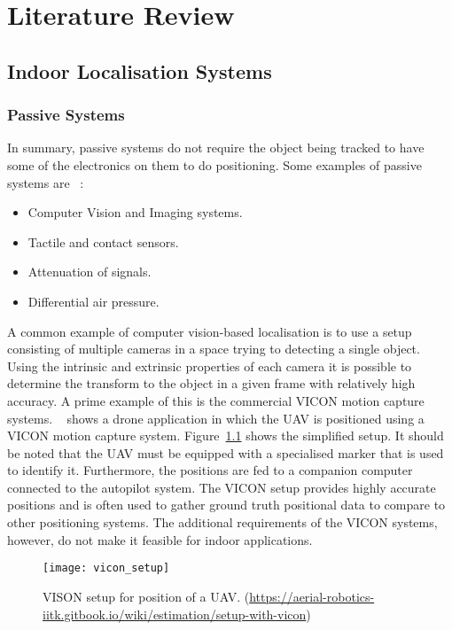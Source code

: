 \chapter{Literature Review}\label{ch:literature-review}
\section{Indoor Localisation Systems}\label{sec:indoor-localisation-sensors}
\subsection{Passive Systems}\label{subsec:passive-systems}
In summary, passive systems do not require the object being tracked to have some of the electronics on them to do positioning.
Some examples of passive systems are ~\citep{deak2012survey}:
\begin{itemize}
    \item Computer Vision and Imaging systems.
    \item Tactile and contact sensors.
    \item Attenuation of signals.
    \item Differential air pressure.
\end{itemize}
A common example of computer vision-based localisation is to use a setup consisting of multiple cameras in a space trying to detecting a single object.
Using the intrinsic and extrinsic properties of each camera it is possible to determine the transform to the object in a given frame with relatively high accuracy.
A prime example of this is the commercial VICON motion capture systems.
~\cite{aerialrobotsiitk} shows a drone application in which the UAV is positioned using a VICON motion capture system.
Figure~\ref{fig:vs} shows the simplified setup.
It should be noted that the UAV must be equipped with a specialised marker that is used to identify it.
Furthermore, the positions are fed to a companion computer connected to the autopilot system.
The VICON setup provides highly accurate positions and is often used to gather ground truth positional data to compare to other positioning systems.
The additional requirements of the VICON systems, however, do not make it feasible for indoor applications.

\begin{figure}[h!]
    \centering
    \texttt{[image: vicon\_setup]}
    \caption{VISON setup for position of a UAV. (\url{https://aerial-robotics-iitk.gitbook.io/wiki/estimation/setup-with-vicon})}
    \label{fig:vs}
\end{figure}

